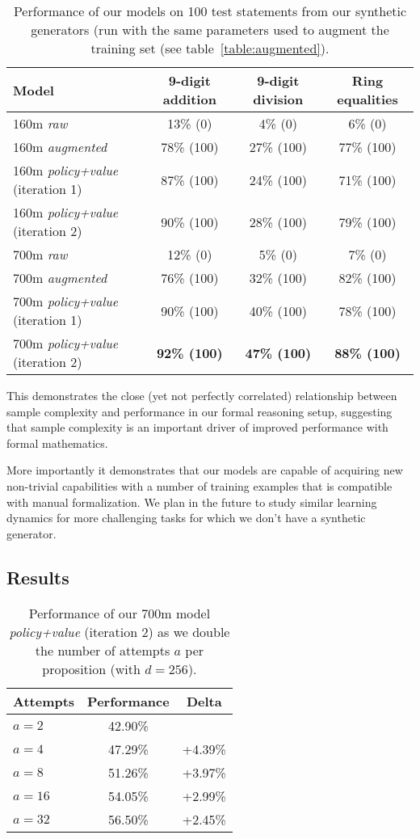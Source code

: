 \documentclass{article}
\begin{document}
\begin{table}[ht]
\caption{Performance of our models on 100 test statements from our synthetic generators (run with the same parameters used to augment the training set (see table~\ref{table:augmented}).} 
\centering
\begin{tabular}{ |l|c|c|c| }
    \hline
    Model & 9-digit addition & 9-digit division & Ring equalities \\
    \hline
    160m \textit{raw} & 13\% (0) & 4\% (0) & 6\% (0) \\
    160m \textit{augmented} & 78\% (100) & 27\% (100) & 77\% (100) \\
    160m \textit{policy+value} (iteration 1) & 87\% (100) & 24\% (100) & 71\% (100) \\
    160m \textit{policy+value} (iteration 2) & 90\% (100) & 28\% (100) & 79\% (100) \\
    700m \textit{raw} & 12\% (0) & 5\% (0) & 7\% (0) \\
    700m \textit{augmented} & 76\% (100) & 32\% (100) & 82\% (100) \\
    700m \textit{policy+value} (iteration 1) & 90\% (100) & 40\% (100) & 78\% (100) \\
    700m \textit{policy+value} (iteration 2) & \textbf{92\% (100)} & \textbf{47\% (100)} & \textbf{88\% (100)} \\
    \hline
\end{tabular}
\label{table:samplecomplexity}
\end{table}

This demonstrates the close (yet not perfectly correlated) relationship between sample complexity and performance in our formal reasoning setup, suggesting that sample complexity is an important driver of improved performance with formal mathematics.

More importantly it demonstrates that our models are capable of acquiring new non-trivial capabilities with a number of training examples that is compatible with manual formalization. We plan in the future to study similar learning dynamics for more challenging tasks for which we don't have a synthetic generator.

\subsection{Results}

\begin{table}[ht]
\caption{Performance of our 700m model \textit{policy+value} (iteration 2) as we double the number of attempts $a$ per proposition (with $d=256$).} 
\centering
\begin{tabular}{ |l|c|c| }
    \hline
    Attempts & Performance & Delta \\
    \hline
    $a=2$ & 42.90\% & \\
    $a=4$ & 47.29\% & +4.39\% \\
    $a=8$ & 51.26\% & +3.97\% \\
    $a=16$ & 54.05\% & +2.99\% \\
    $a=32$ & 56.50\% & +2.45\% \\
    \hline
\end{tabular}
\label{table:attempts}
\end{table}
\end{document}
